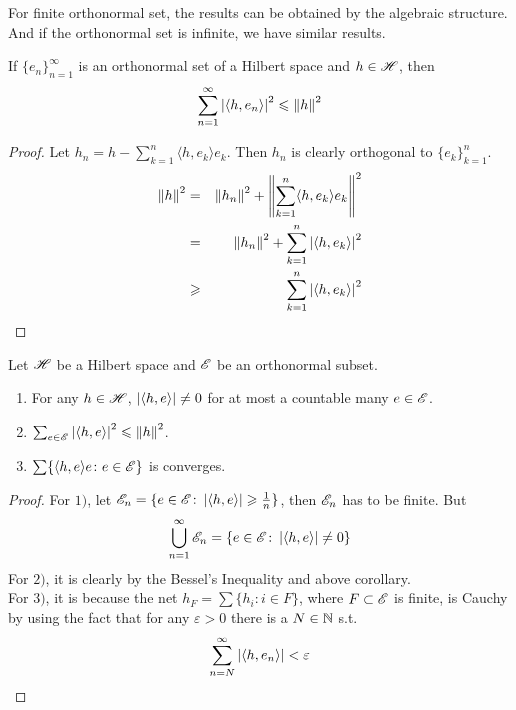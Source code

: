\documentclass[a4paper,11pt]{report}
\begin{document}
For finite orthonormal set, the results can be obtained by the algebraic structure. And if the orthonormal set is infinite, we have similar results.
\begin{thm}
	If $\{e_n\}_{n=1}^{\infty}$ is an orthonormal set of a Hilbert space and $h \in \mathscr{H}$, then
	\begin{equation*}
		\sum_{n=1}^{\infty} \left\lvert \langle h,e_n \rangle\right\lvert^{2} \leqslant \left\lVert h\right\lVert^{2}
	\end{equation*}
\end{thm}
\begin{proof}
	Let $h_n=h-\sum_{k=1}^{n}  \langle h,e_k \rangle e_k$. Then $h_n$ is clearly orthogonal to $\{e_k\}_{k=1}^{n}$.
	\begin{eqnarray*}
		\left\lVert h\right\lVert^{2} &=& \left\lVert h_n\right\lVert^{2} + \left\lVert\sum_{k=1}^{n}  \langle h,e_k \rangle e_k\right\lVert^{2} \\
		&=& \left\lVert h_n\right\lVert^{2} + \sum_{k=1}^{n} \left\lvert \langle h,e_k \rangle \right\lvert^{2} \\
		&\geqslant& \sum_{k=1}^{n} \left\lvert \langle h,e_k \rangle \right\lvert^{2}
	\end{eqnarray*}	
\end{proof}
\begin{cor}
	Let $\mathscr{H}$ be a Hilbert space and $\mathscr{E}$ be an orthonormal subset. 
	\begin{enumerate}[label=\arabic*)]
		\item For any $h \in \mathscr{H}$, $\left\lvert \langle h,e \rangle \right\lvert \neq 0$ for at most a countable many $e \in \mathscr{E}$.
		\item $\sum_{e \in \mathscr{E}} \left\lvert \langle h,e \rangle \right\lvert^{2} \leqslant \left\lVert h\right\lVert^{2}$.
		\item $\sum \{ \langle h,e \rangle e \colon e \in \mathscr{E}\}$ is converges.
	\end{enumerate}
\end{cor}
\begin{proof}
	For $1)$, let $\mathscr{E}_n=\{e \in \mathscr{E} \colon \left\lvert \langle h,e \rangle \right\lvert \geqslant \frac{1}{n}\}$, then $\mathscr{E}_n$ has to be finite. But 
	\begin{equation*}
		\bigcup_{n=1}^{\infty} \mathscr{E}_n = \{e \in \mathscr{E} \colon \left\lvert \langle h,e \rangle \right\lvert \neq 0\}
	\end{equation*}
	For $2)$, it is clearly by the Bessel's Inequality and above corollary.\\
	For $3)$, it is because the net $h_F = \sum \{h_i \colon i \in F\}$, where $F \subset \mathscr{E}$ is finite, is Cauchy by using the fact that for any $\varepsilon  >  0$ there is a $N \in \mathbb{N}$ s.t. 
	\begin{equation*}
		\sum_{n=N}^{\infty} \left\lvert \langle h,e_n \rangle \right\lvert  <  \varepsilon
	\end{equation*}
\end{proof}
\end{document}
